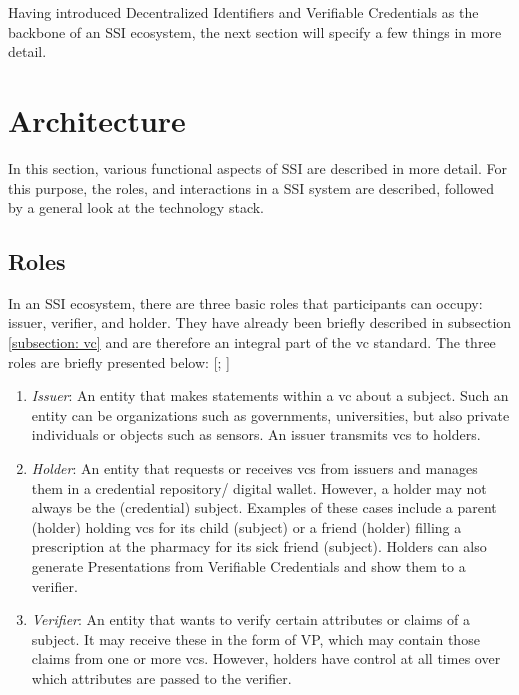         Having introduced Decentralized Identifiers and Verifiable Credentials as the backbone of an \ac{SSI} ecosystem, the next section will specify a few things in more detail.
	   
    \section{Architecture}
        In this section, various functional aspects of \ac{SSI} are described in more detail. For this purpose, the roles, and interactions in a \ac{SSI} system are described, followed by a general look at the technology stack.
        
    	\subsection{Roles}\label{subsection: vc roles}
    	
    	In an \ac{SSI} ecosystem, there are three basic roles that participants can occupy: issuer, verifier, and holder. They have already been briefly described in subsection \ref{subsection: vc} and are therefore an integral part of the \ac{vc} standard. The three roles are briefly presented below: [\citealp[pp. 25-26]{preukschat_self-sovereign_2021}; \citealp{sporny_verifiable_2019}]
    	
    	\begin{enumerate}
        	\item \textit{Issuer}: An entity that makes statements within a \ac{vc} about a subject. Such an entity can be organizations such as governments, universities, but also private individuals or objects such as sensors. An issuer transmits \acp{vc} to holders.
        	\item \textit{Holder}: An entity that requests or receives \acp{vc} from issuers and manages them in a credential repository/ digital wallet. However, a holder may not always be the (credential) subject. Examples of these cases include a parent (holder) holding \acp{vc} for its child (subject) or a friend (holder) filling a prescription at the pharmacy for its sick friend (subject). Holders can also generate Presentations from Verifiable Credentials and show them to a verifier.  
        	\item \textit{Verifier}: An entity that wants to verify certain attributes or claims of a subject. It may receive these in the form of \ac{VP}, which may contain those claims from one or more \acp{vc}. However, holders have control at all times over which attributes are passed to the verifier.
        \end{enumerate}
        
